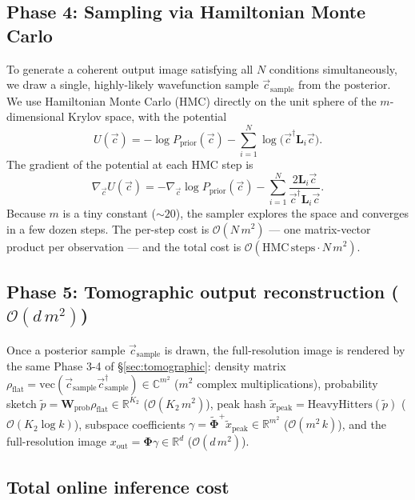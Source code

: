 \documentclass[11pt, a4paper]{article}
\newcommand{\Rset}{\mathbb{R}}
\newcommand{\Cset}{\mathbb{C}}
\begin{document}
\subsection{Phase 4: Sampling via Hamiltonian Monte Carlo}

To generate a coherent output image satisfying all $N$ conditions
simultaneously, we draw a single, highly-likely wavefunction sample
$\vec c_{\mathrm{sample}}$ from the posterior. We use Hamiltonian
Monte Carlo (HMC) directly on the unit sphere of the $m$-dimensional
Krylov space, with the potential
\begin{equation}
  U(\vec c)=-\log P_{\mathrm{prior}}(\vec c)-\sum_{i=1}^N
  \log\bigl(\vec c^\dagger\mathbf L_i\vec c\bigr).
  \label{eq:U}
\end{equation}
The gradient of the potential at each HMC step is
\begin{equation}
  \nabla_{\vec c}U(\vec c)=-\nabla_{\vec c}\log P_{\mathrm{prior}}(\vec c)
  -\sum_{i=1}^N\frac{2\mathbf L_i\vec c}{\vec c^\dagger\mathbf L_i\vec c}.
  \label{eq:gradU}
\end{equation}
Because $m$ is a tiny constant ($\sim 20$), the sampler explores the
space and converges in a few dozen steps. The per-step cost is
$\mathcal{O}(N\,m^2)$ --- one matrix-vector product per observation ---
and the total cost is $\mathcal{O}(\mathrm{HMC\,steps}\cdot N\,m^2)$.

\subsection{Phase 5: Tomographic output reconstruction ($\mathcal{O}(d\,m^2)$)}

Once a posterior sample $\vec c_{\mathrm{sample}}$ is drawn, the
full-resolution image is rendered by the same Phase 3-4 of
\S\ref{sec:tomographic}: density matrix $\rho_{\mathrm{flat}}=
\mathrm{vec}(\vec c_{\mathrm{sample}}\vec c_{\mathrm{sample}}^\dagger)
\in\Cset^{m^2}$ ($m^2$ complex multiplications), probability sketch
$\tilde p=\mathbf W_{\mathrm{prob}}\rho_{\mathrm{flat}}\in\Rset^{K_2}$
($\mathcal{O}(K_2\,m^2)$), peak hash
$\tilde x_{\mathrm{peak}}=\mathrm{HeavyHitters}(\tilde p)$
($\mathcal{O}(K_2\log k)$), subspace coefficients
$\gamma=\tilde{\mathbf\Phi}^+\tilde x_{\mathrm{peak}}\in\Rset^{m^2}$
($\mathcal{O}(m^2\,k)$), and the full-resolution image
$x_{\mathrm{out}}=\mathbf\Phi\gamma\in\Rset^d$
($\mathcal{O}(d\,m^2)$).

\subsection{Total online inference cost}
\end{document}
